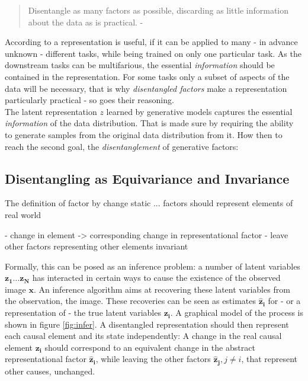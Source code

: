 	\begin{quote}
		{Disentangle as many factors as possible, discarding as little information about the data as is practical.} - \cite{bengio13rep} %
	\end{quote}

	According to \cite{bengio13rep} a representation is useful, if it can be applied to many - in advance unknown - different tasks, while being trained on only one particular task.
	As the downstream tasks can be multifarious, the essential \textit{information} should be contained in the representation.
	For some tasks only a subset of aspects of the data will be necessary, that is why \textit{disentangled factors} make a representation particularly practical - so goes their reasoning.\\
	The latent representation $z$ learned by generative models captures the essential \textit{information} of the data distribution. That is made sure by requiring the ability to generate samples from the original data distribution from it.
	How then to reach the second goal, the \textit{disentanglement} of generative factors:

	\subsection{Disentangling as Equivariance and Invariance}
		The
		definition of factor by change static ...
		factors should represent elements of real world

		- change in element -> corresponding change in representational factor
		- leave other factors representing other elements invariant

		Formally, this can be posed as an inference problem: a number of latent variables $\mathbf{z_1}\ldots\mathbf{z_N}$ has interacted in certain ways to cause the existence of the observed image $\mathbf{x}$. An inference algorithm aims at recovering these latent variables from the observation, \ie the image. These recoveries can be seen as estimates $\mathbf{\hat z_i}$ for - or a representation of - the true latent variables $\mathbf{z_i}$. A graphical model of the process is shown in figure \ref{fig:infer}.
		A disentangled representation should then represent each causal element and its state independently: A change in the real causal element $\mathbf{z_i}$ should correspond to an equivalent change in the abstract representational factor $\mathbf{\hat z_i}$, while leaving the other factors $\mathbf{\hat z_j}, j\neq i$, that represent other causes, unchanged.

